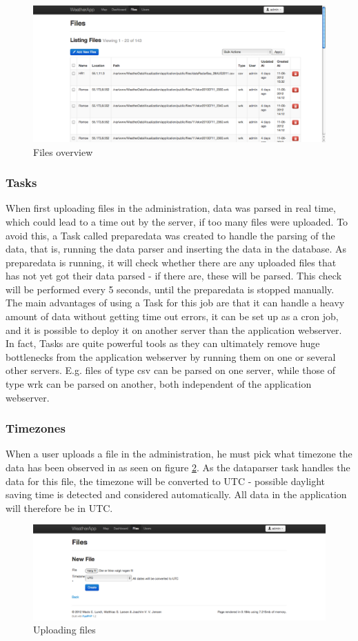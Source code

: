 \begin{figure}[htbp]
   \centering
   \includegraphics[width=.95\linewidth]{figure/adminCRUD.eps}
   \caption{Files overview}
   \label{fig:admin}
\end{figure}

\subsubsection{Tasks}
\label{sec:tasks}
When first uploading files in the administration, data was parsed in real time, which could lead to a time out by the server, if too many files were uploaded. To avoid this, a \textsf{Task} called \textsf{preparedata} was created to handle the parsing of the data, that is, running the data parser and inserting the data in the database. As \textsf{preparedata} is running, it will check whether there are any uploaded files that has not yet got their data parsed - if there are, these will be parsed. This check will be performed every 5 seconds, until the \textsf{preparedata} is stopped manually.
The main advantages of using a \textsf{Task} for this job are that it can handle a heavy amount of data without getting time out errors, it can be set up as a cron job, and it is possible to deploy it on another server than the application webserver.
In fact, \textsf{Tasks} are quite powerful tools as they can ultimately remove huge bottlenecks from the application webserver by running them on one or several other servers. E.g. files of type \textsf{csv} can be parsed on one server, while those of type \textsf{wrk} can be parsed on another, both independent of the application webserver.

\subsubsection{Timezones}
\label{sec:timezones}
When a user uploads a file in the administration, he must pick what timezone the data has been observed in as seen on figure \ref{fig:upload}. As the dataparser task handles the data for this file, the timezone will be converted to UTC - possible daylight saving time is detected and considered automatically. All data in the application will therefore be in UTC.

\begin{figure}[htbp]
   \centering
   \includegraphics[width=.95\linewidth]{figure/uploadfiles.eps}
   \caption{Uploading files}
   \label{fig:upload}
\end{figure}